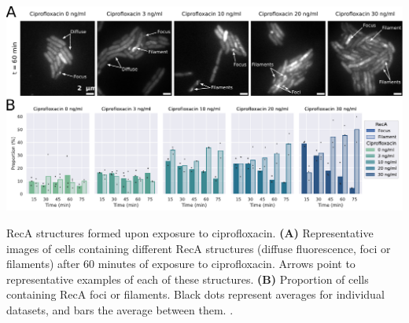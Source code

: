 \begin{suppfigure*}[htbp]
    \begin{center}
    \includegraphics[width=\textwidth]{SI_Figures/RecA_structures.pdf}
    \end{center}
    \caption{RecA structures formed upon exposure to ciprofloxacin. \textbf{(A)} Representative images of cells containing different RecA structures (diffuse fluorescence, foci or filaments) after 60 minutes of exposure to ciprofloxacin. Arrows point to representative examples of each of these structures. \textbf{(B)} Proportion of cells containing RecA foci or filaments. Black dots represent averages for individual datasets, and bars the average between them. .}
    \label{SIFig:reca_structures}
\end{suppfigure*}
